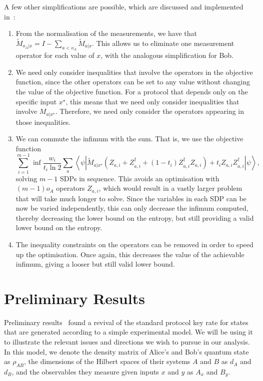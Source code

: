 \documentclass[10pt, a4paper]{article}
\numberwithin{equation}{section} %
\theoremstyle{definition}
\theoremstyle{plain}
\newcommand{\?}{\mathrel{?}} %
\newcommand{\angleb}[1]{\left\langle #1 \right\rangle} %
\begin{document}
            A few other simplifications are possible, which are discussed and implemented in~\cite{BFF_QRE}:
            \begin{enumerate}
              \item From the normalisation of the measurements, we have that \(\tilde{M}_{o_A|x} = I - \sum_{a < o_A} \tilde{M}_{a|x}\). This allows us to eliminate one measurement operator for each value of \(x\), with the analogous simplification for Bob.
              \item We need only consider inequalities that involve the operators in the objective function, since the other operators can be set to any value without changing the value of the objective function. For a protocol that depends only on the specific input \(x^{\star}\), this means that we need only consider inequalities that involve \(M_{a|x^{\star}}\). Therefore, we need only consider the operators appearing in those inequalities.
              \item We can commute the infimum with the sum. That is, we use the objective function
                \begin{equation} 
                  \sum_{i=1}^{m-1} \inf \frac{w_i}{t_i \ln 2} \sum_a \angleb{\psi\left|
                  \tilde{M}_{a|x^{\star}} \left( Z_{a,i} + Z_{a,i}^{\dagger} + (1-t_i)  Z_{a,i}^{\dagger}Z_{a,i}\right) + t_i Z_{a,i}Z_{a,i}^{\dagger} \right|\psi},
                \end{equation}
                solving \(m-1\) SDPs in sequence. This avoids an optimisation with \((m-1)o_A\) operators \(Z_{a,i}\), which would result in a vastly larger problem that will take much longer to solve. Since the variables in each SDP can be now be varied independently, this can only decrease the infimum computed, thereby decreasing the lower bound on the entropy, but still providing a valid lower bound on the entropy.
              \item The inequality constraints on the operators can be removed in order to speed up the optimisation. Once again, this decreases the value of the achievable infimum, giving a looser but still valid lower bound.
            \end{enumerate}

            \section{Preliminary Results}\label{sec:preres}

            Preliminary results~\cite{KTNotes} found a revival of the standard protocol key rate for states that are generated according to a simple experimental model. We will be using it to illustrate the relevant issues and directions we wish to pursue in our analysis. In this model, we denote the density matrix of Alice's and Bob's quantum state as \(\rho_{AB}\), the dimensions of the Hilbert spaces of their systems \(A\) and \(B\) as \(d_A\) and \(d_B\), and the observables they measure given inputs \(x\) and \(y\) as \(A_x\) and \(B_y\).
\end{document}
